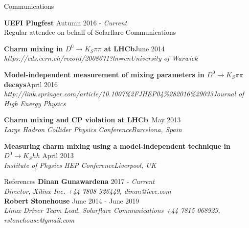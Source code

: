 \documentclass{format/resume} %
\begin{document}
\begin{rSection}{Communications}

  {\bf UEFI Plugfest} \hfill {Autumn 2016 - \it Current} \\
  { Regular attendee on behalf of Solarflare Communications }

  {\bf Charm mixing in $D^{0}\rightarrow K_{S}\pi\pi$ at LHCb}\hfill{June 2014}\\
  {\it https://cds.cern.ch/record/2008671?ln=en}\hfill{\it University of Warwick}

  {\bf Model-independent measurement of mixing parameters in $D^{0}\rightarrow K_{S}\pi\pi$ decays}\hfill{April 2016}\\
  {\it http://link.springer.com/article/10.1007\%2FJHEP04\%282016\%29033}\hfill{\it Journal of High Energy Physics}


  {\bf Charm mixing and CP violation at LHCb}\hfill{\ May 2013}\\
  {\it Large Hadron Collider Physics Conference}\hfill{\it Barcelona, Spain}

  {\bf Measuring charm mixing using a model-independent technique in $D^{0} \rightarrow K_{S}hh$}\hfill{ April 2013}\\
  {\it Institute of Physics HEP Conference}\hfill{\it Liverpool, UK}

\end{rSection}


\begin{rSection}{References}
  {\bf Dinan Gunawardena} \hfill {2017 -  \it Current} \\
  {\it Director, Xilinx Inc.} \hfill {\it +44 7808 926449, dinan@ieee.com} \\

  {\bf Robert Stonehouse} \hfill {June 2014 -  June 2019} \\
  {\it Linux Driver Team Lead, Solarflare Communications} \hfill {\it +44 7815 068929, rstonehouse@gmail.com} \\

\end{rSection}

\end{document}
